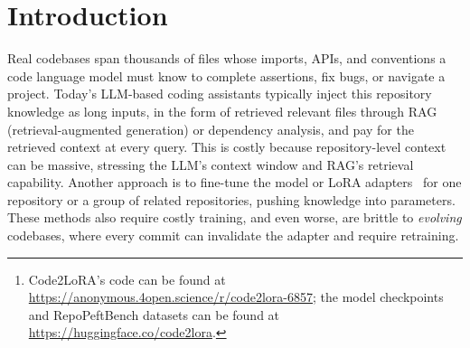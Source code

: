 \documentclass{llmxive}
\title{\Title}
\author{Liliana Hotsko \and Yinxi Li \and Yuntian Deng \and Pengyu Nie}
\providecommand{\UseMacro}[1]{\csname rmk-#1\endcsname}
\providecommand{\codelora}{Code2LoRA\xspace}
\providecommand{\repopeftbench}{RepoPeftBench\xspace}
\providecommand{\URLRepo}{\url{https://anonymous.4open.science/r/code2lora-6857}}
\providecommand{\URLData}{\url{https://huggingface.co/code2lora}}
\providecommand{\codelorastatic}{\codelora-Static\xspace}
\providecommand{\codeloraevo}{\codelora-Evo\xspace}
\begin{document}
\maketitle
\begin{abstract}
Code language models need repository-level context to resolve imports, APIs, and project conventions.
Existing methods inject this knowledge as long inputs (retrieved through RAG or dependency analysis) or through per-repository fine-tuning and LoRA---costly at repository scale and brittle to evolving codebases.
We introduce \codelora{}, a hypernetwork framework that generates repository-specific LoRA adapters, effectively injecting repository knowledge with zero inference-time token overhead.
\codelora{} supports two usage scenarios: \codelorastatic{} converts a single repository snapshot into an adapter, suitable for comprehension of stable codebases;
while \codeloraevo{} maintains an adapter backed by a GRU hidden state updated per code diff, suitable for active development of evolving codebases.
To evaluate \codelora{} against parameter-efficient fine-tuning baselines, we build \repopeftbench{}, a benchmark of \UseMacro{num-repos-total} Python repositories with two tracks: a static track with \UseMacro{num-static-train-short} training and \UseMacro{num-static-test-short} test assertion-completion tasks, and an evolution track with \UseMacro{num-commit-train-short} commit-derived training and \UseMacro{num-commit-test-short} commit-derived test tasks.
On the static track, \codelorastatic{} achieves \UseMacro{cr-em-codelorastatic}\% cross-repo and \UseMacro{ir-em-codelorastatic}\% in-repo exact match, matching the per-repository LoRA upper bound;
on the evolution track, \codeloraevo{} achieves \UseMacro{cd-cr-em-codeloraevo}\% cross-repo exact match (+\UseMacro{cd-cr-em-delta-codeloraevo}\,pp over a single shared LoRA).\footnote{\codelora{}'s code can be found at \URLRepo{}; the model checkpoints and \repopeftbench{} datasets can be found at \URLData{}.}
\end{abstract}
\section{Introduction}
\label{sec:intro}

Real codebases span thousands of files whose imports, APIs, and conventions a code language model must know to complete assertions, fix bugs, or navigate a project.
Today's LLM-based coding assistants typically inject this repository knowledge as long inputs, in the form of retrieved relevant files through RAG (retrieval-augmented generation) or dependency analysis, and pay for the retrieved context at every query.
This is costly because repository-level context can be massive, stressing the LLM's context window and RAG's retrieval capability.
Another approach is to fine-tune the model or LoRA adapters~\cite{hu2022lora} for one repository or a group of related repositories, pushing knowledge into parameters.
These methods also require costly training, and even worse, are brittle to \emph{evolving} codebases, where every commit can invalidate the adapter and require retraining.
\end{document}
